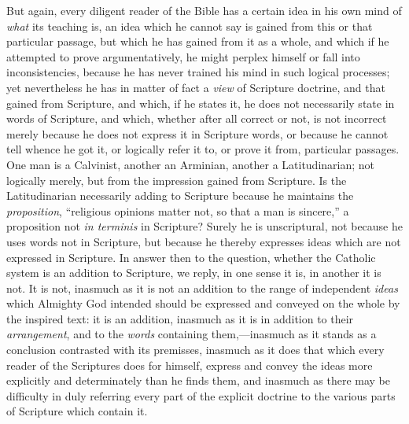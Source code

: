 But again, every diligent
reader of the Bible has a certain idea in his own mind of \emph{what}
its teaching is, an idea which he cannot say is gained from this or
that particular passage, but which he has gained from it as a whole,
and which if he attempted to prove argumentatively, he might perplex
himself or fall into inconsistencies, because he has never trained his
mind in such logical processes; yet nevertheless he has in matter of
fact a \emph{view} of Scripture doctrine, and that gained from
Scripture, and which, if he states it, he does not necessarily state
in words of Scripture, and which, whether after all correct or not, is
not incorrect merely because he does not express it in Scripture
words, or because he cannot tell whence he got it, or logically refer
it to, or prove it from, particular passages. One man is a Calvinist,
another an Arminian, another a Latitudinarian; not logically merely,
but from the impression gained from Scripture. Is the Latitudinarian
necessarily adding to Scripture because he maintains the \emph{proposition},
``religious opinions matter not, so that a man is sincere,'' a
proposition not \emph{in terminis} in Scripture? Surely he is
unscriptural, not because he uses words not in Scripture, but because
he thereby expresses ideas which are not expressed in Scripture. In
answer then to the question, whether the Catholic system is an
addition to Scripture, we reply, in one sense it is, in another it is
not. It is not, inasmuch as it is not an addition to the range of
independent \emph{ideas} which Almighty God intended should be
expressed and conveyed on the whole by the inspired text: it is an
addition, inasmuch as it is in addition to their \emph{arrangement},
and to the \emph{words} containing them,—inasmuch as it stands as a
conclusion contrasted with its premisses, inasmuch as it does that
which every reader of the Scriptures does for himself, express and
convey the ideas more explicitly and determinately than he finds them,
and inasmuch as there may be difficulty in duly referring every part
of the explicit doctrine to the various parts of Scripture which
contain it.

